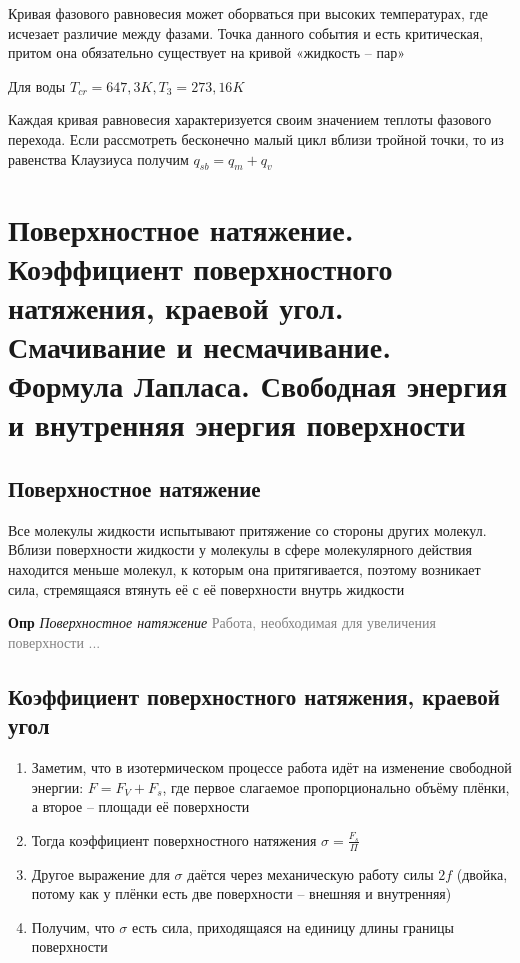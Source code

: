 \documentclass[a4paper, 14pt]{article}
\begin{document}
    Кривая фазового равновесия может оборваться при высоких температурах, где исчезает различие между фазами.
    Точка данного события и есть критическая, притом она обязательно существует на кривой «жидкость -- пар»
    
    Для воды $T_{cr} = 647,3 K, T_3 = 273,16 K$
    
    Каждая кривая равновесия характеризуется своим значением теплоты фазового перехода.
    Если рассмотреть бесконечно малый цикл вблизи тройной точки, то из равенства Клаузиуса получим $q_{sb} = q_m + q_{v}$
    
    \section{Поверхностное натяжение.
    Коэффициент поверхностного натяжения, краевой угол.
    Смачивание и несмачивание.
    Формула Лапласа.
    Свободная энергия и внутренняя энергия поверхности}
    
    \subsection{Поверхностное натяжение}
    
    Все молекулы жидкости испытывают притяжение со стороны других молекул.
    Вблизи поверхности жидкости у молекулы в сфере молекулярного действия находится меньше молекул, к которым она
    притягивается, поэтому возникает сила, стремящаяся втянуть её с её поверхности внутрь жидкости
    
    \textbf{Опр} \textit{Поверхностное натяжение} \textcolor{gray}{Работа, необходимая для увеличения поверхности ...}
    
    \subsection{Коэффициент поверхностного натяжения, краевой угол}
    
    \begin{enumerate}
        \item Заметим, что в изотермическом процессе работа идёт на изменение свободной энергии: $F = F_V + F_s$, где
        первое слагаемое пропорционально объёму плёнки, а второе -- площади её поверхности
        \item Тогда коэффициент поверхностного натяжения $\sigma = \frac{F_s}{\Pi}$
        \item Другое выражение для $\sigma$ даётся через механическую работу силы $2f$ (двойка, потому как у плёнки
        есть две поверхности -- внешняя и внутренняя)
        \item Получим, что $\sigma$ есть сила, приходящаяся на единицу длины границы поверхности
    \end{enumerate}
    
\end{document}
